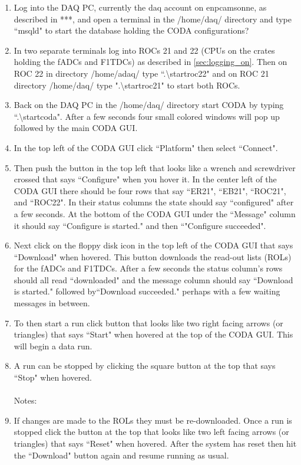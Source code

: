 \documentclass[oneside]{book}   %
\begin{document}
\begin{enumerate}
	\item Log into the DAQ PC, currently the daq account on enpcamsonne, as described in ***, and open a terminal in the /home/daq/ directory and type ``msqld" to start the database holding the CODA configurations? 
	\item In two separate terminals log into ROCs 21 and 22 (CPUs on the crates holding the fADCs and F1TDCs) as described in \cref{sec:logging_on}. Then on ROC 22 in directory /home/adaq/ type ``.\textbackslash startroc22" and on ROC 21 directory /home/daq/ type ".\textbackslash startroc21" to start both ROCs. %
	\item Back on the DAQ PC in the /home/daq/ directory start CODA by typing ``.\textbackslash startcoda". After a few seconds four small colored windows will pop up followed by the main CODA GUI.
	\item In the top left of the CODA GUI click ``Platform" then select ``Connect". 
	\item Then push the button in the top left that looks like a wrench and screwdriver crossed that says ``Configure" when you hover it. In the center left of the CODA GUI there should be four rows that say ``ER21", ``EB21", ``ROC21", and ``ROC22". In their status columns the state should say ``configured" after a few seconds. At the bottom of the CODA GUI under the ``Message" column it should say ``Configure is started." and then ``"Configure succeeded". 
	\item Next click on the floppy disk icon in the top left of the CODA GUI that says ``Download" when hovered. This button downloads the read-out lists (ROLs) for the fADCs and F1TDCs. After a few seconds the status column's rows should all read ``downloaded" and the message column should say ``Download is started." followed by``Download succeeded." perhaps with a few waiting messages in between.
	\item To then start a run click button that looks like two right facing arrows (or triangles) that says ``Start" when hovered at the top of the CODA GUI. This will begin a data run.
	\item A run can be stopped by clicking the square button at the top that says ``Stop" when hovered.\\
	\\
	Notes:
	\item If changes are made to the ROLs they must be re-downloaded. Once a run is stopped click the button at the top that looks like two left facing arrows (or triangles) that says ``Reset" when hovered. After the system has reset then hit the ``Download" button again and resume running as usual.
\end{enumerate}
\end{document}
